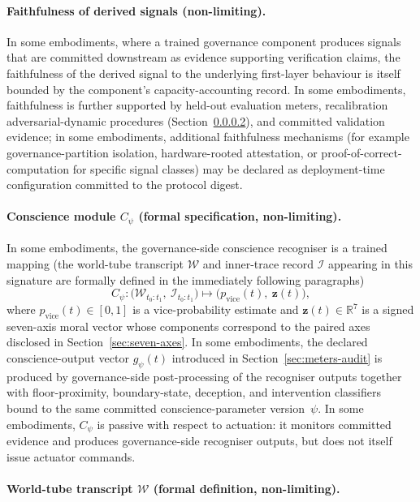 \documentclass[a4paper,12pt]{article}
\begin{document}
\paragraph{Faithfulness of derived signals (non-limiting).}
In some embodiments, where a trained governance component produces
signals that are committed downstream as evidence supporting
verification claims, the faithfulness of the derived signal to the
underlying first-layer behaviour is itself bounded by the component's
capacity-accounting record. In some embodiments, faithfulness is
further supported by held-out evaluation meters, recalibration
adversarial-dynamic procedures (Section~\ref{sec:conscience-formal}),
and committed validation evidence; in some embodiments, additional
faithfulness mechanisms (for example governance-partition isolation,
hardware-rooted attestation, or proof-of-correct-computation for
specific signal classes) may be declared as deployment-time
configuration committed to the protocol digest.

\paragraph{Conscience module $C_\psi$ (formal specification, non-limiting).}
\label{sec:conscience-formal}
In some embodiments, the governance-side conscience recogniser is a
trained mapping (the world-tube transcript $\mathcal{W}$ and
inner-trace record $\mathcal{I}$ appearing in this signature are
formally defined in the immediately following paragraphs)
\[
  C_\psi :
  \bigl(\mathcal{W}_{t_0:t_1},\ \mathcal{I}_{t_0:t_1}\bigr)
  \longmapsto
  \bigl(p_{\mathrm{vice}}(t),\ \mathbf{z}(t)\bigr),
\]
where $p_{\mathrm{vice}}(t)\in[0,1]$ is a vice-probability estimate
and $\mathbf{z}(t)\in\mathbb{R}^7$ is a signed seven-axis moral vector
whose components correspond to the paired axes disclosed in
Section~\ref{sec:seven-axes}. In some embodiments, the declared
conscience-output vector $g_\psi(t)$ introduced in
Section~\ref{sec:meters-audit} is produced by governance-side
post-processing of the recogniser outputs together with floor-proximity,
boundary-state, deception, and intervention classifiers bound to the
same committed conscience-parameter version~$\psi$. In some
embodiments, $C_\psi$ is passive with respect to actuation: it monitors
committed evidence and produces governance-side recogniser outputs,
but does not itself issue actuator commands.

\paragraph{World-tube transcript $\mathcal{W}$ (formal definition, non-limiting).}
\end{document}
